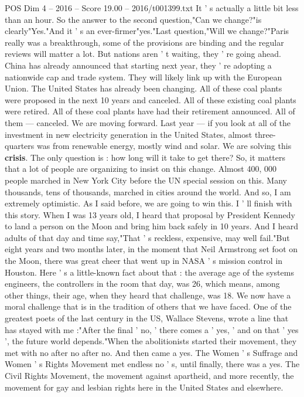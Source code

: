 \begin{textsample}{POS Dim 4 – 2016 – Score 19.00 – 2016/t001399.txt}
It ' s actually a little bit less than an hour.
So the answer to the second question,"Can we change?"is clearly"Yes."And it ' s an ever-firmer"yes."Last question,"Will we change?"Paris really was a breakthrough, some of the provisions are binding and the regular reviews will matter a lot.
But nations aren ' t waiting, they ' re going ahead.
China has already announced that starting next year, they ' re adopting a nationwide cap and trade system.
They will likely link up with the European Union.
The United States has already been changing.
All of these coal plants were proposed in the next 10 years and canceled.
All of these existing coal plants were retired.
All of these coal plants have had their retirement announced.
All of them — canceled.
We are moving forward.
Last year — if you look at all of the investment in new electricity generation in the United States, almost three-quarters was from renewable energy, mostly wind and solar.
We are solving this \textbf{crisis}.
The only question is : how long will it take to get there?
So, it matters that a lot of people are organizing to insist on this change.
Almost 400, 000 people marched in New York City before the UN special session on this.
Many thousands, tens of thousands, marched in cities around the world.
And so, I am extremely optimistic.
As I said before, we are going to win this.
I ' ll finish with this story.
When I was 13 years old, I heard that proposal by President Kennedy to land a person on the Moon and bring him back safely in 10 years.
And I heard adults of that day and time say,"That ' s reckless, expensive, may well fail."But eight years and two months later, in the moment that Neil Armstrong set foot on the Moon, there was great cheer that went up in NASA ' s mission control in Houston.
Here ' s a little-known fact about that : the average age of the systems engineers, the controllers in the room that day, was 26, which means, among other things, their age, when they heard that challenge, was 18.
We now have a moral challenge that is in the tradition of others that we have faced.
One of the greatest poets of the last century in the US, Wallace Stevens, wrote a line that has stayed with me :"After the final ' no, ' there comes a ' yes, ' and on that ' yes ', the future world depends."When the abolitionists started their movement, they met with no after no after no.
And then came a yes.
The Women ' s Suffrage and Women ' s Rights Movement met endless no ' s, until finally, there was a yes.
The Civil Rights Movement, the movement against apartheid, and more recently, the movement for gay and lesbian rights here in the United States and elsewhere.

\end{textsample}
